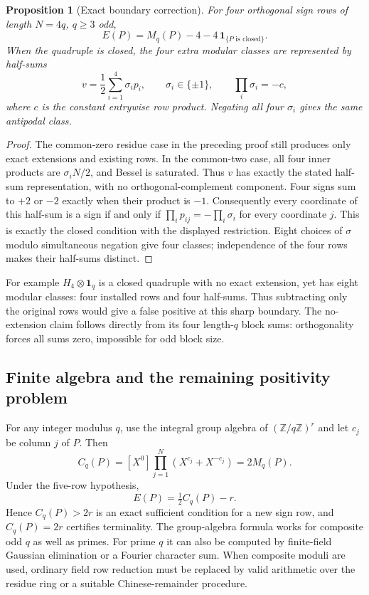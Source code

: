\documentclass[11pt]{article}
\newtheorem{proposition}[theorem]{Proposition}
\begin{document}
\begin{proposition}[Exact boundary correction]
For four orthogonal sign rows of length $N=4q$, $q\ge3$ odd,
\[
 E(P)=M_q(P)-4-4\,\mathbf1_{\{P\text{ is closed}\}}.
\]
When the quadruple is closed, the four extra modular classes are
represented by half-sums
\[
 v=\frac12\sum_{i=1}^4\sigma_i p_i,
 \qquad\sigma_i\in\{\pm1\},\qquad
 \prod_i\sigma_i=-c,
\]
where $c$ is the constant entrywise row product. Negating all four
$\sigma_i$ gives the same antipodal class.
\end{proposition}
\begin{proof}
The common-zero residue case in the preceding proof still produces
only exact extensions and existing rows. In the common-two case,
all four inner products are $\sigma_iN/2$, and Bessel is saturated.
Thus $v$ has exactly the stated half-sum representation, with no
orthogonal-complement component. Four signs sum to $+2$ or $-2$
exactly when their product is $-1$. Consequently every coordinate
of this half-sum is a sign if and only if
$\prod_i p_{ij}=-\prod_i\sigma_i$ for every coordinate $j$.
This is exactly the closed condition with the displayed restriction.
Eight choices of $\sigma$ modulo simultaneous negation give four
classes; independence of the four rows makes their half-sums distinct.
\end{proof}

For example $H_4\otimes\mathbf1_q$ is a closed quadruple with no
exact extension, yet has eight modular classes: four installed rows
and four half-sums. Thus subtracting only the original rows would
give a false positive at this sharp boundary. The no-extension claim
follows directly from its four length-$q$ block sums: orthogonality
forces all sums zero, impossible for odd block size.

\subsection{Finite algebra and the remaining positivity problem}
For any integer modulus $q$, use the integral group algebra of
$(\mathbb Z/q\mathbb Z)^r$ and let $c_j$ be column $j$ of $P$.
Then
\[
 C_q(P)=[X^0]\prod_{j=1}^N(X^{c_j}+X^{-c_j})=2M_q(P).
\]
Under the five-row hypothesis,
\[
 \boxed{E(P)=\tfrac12C_q(P)-r.}
\]
Hence $C_q(P)>2r$ is an exact sufficient condition for a new sign row,
and $C_q(P)=2r$ certifies terminality. The group-algebra formula
works for composite odd $q$ as well as primes. For prime $q$ it can
also be computed by finite-field Gaussian elimination or a Fourier
character sum. When composite moduli are used, ordinary field row
reduction must be replaced by valid arithmetic over the residue ring
or a suitable Chinese-remainder procedure.
\end{document}

